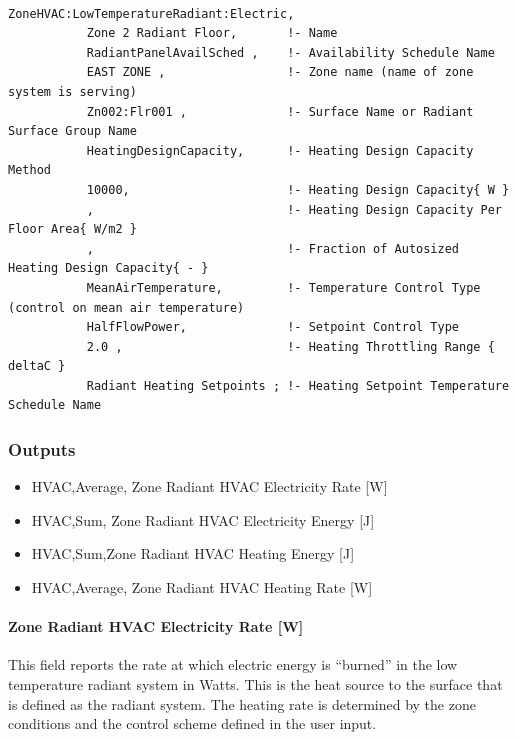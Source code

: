 \begin{lstlisting}

ZoneHVAC:LowTemperatureRadiant:Electric,
           Zone 2 Radiant Floor,       !- Name
           RadiantPanelAvailSched ,    !- Availability Schedule Name
           EAST ZONE ,                 !- Zone name (name of zone system is serving)
           Zn002:Flr001 ,              !- Surface Name or Radiant Surface Group Name
           HeatingDesignCapacity,      !- Heating Design Capacity Method
           10000,                      !- Heating Design Capacity{ W }
           ,                           !- Heating Design Capacity Per Floor Area{ W/m2 }
           ,                           !- Fraction of Autosized Heating Design Capacity{ - }
           MeanAirTemperature,         !- Temperature Control Type (control on mean air temperature)
           HalfFlowPower,              !- Setpoint Control Type
           2.0 ,                       !- Heating Throttling Range { deltaC }
           Radiant Heating Setpoints ; !- Heating Setpoint Temperature Schedule Name
\end{lstlisting}

\subsubsection{Outputs}\label{outputs-7-007}

\begin{itemize}
\item
  HVAC,Average, Zone Radiant HVAC Electricity Rate {[}W{]}
\item
  HVAC,Sum, Zone Radiant HVAC Electricity Energy {[}J{]}
\item
  HVAC,Sum,Zone Radiant HVAC Heating Energy {[}J{]}
\item
  HVAC,Average, Zone Radiant HVAC Heating Rate {[}W{]}
\end{itemize}

\paragraph{Zone Radiant HVAC Electricity Rate {[}W{]}}\label{zone-radiant-hvac-electric-power-w}

This field reports the rate at which electric energy is ``burned'' in the low temperature radiant system in Watts. This is the heat source to the surface that is defined as the radiant system. The heating rate is determined by the zone conditions and the control scheme defined in the user input.

